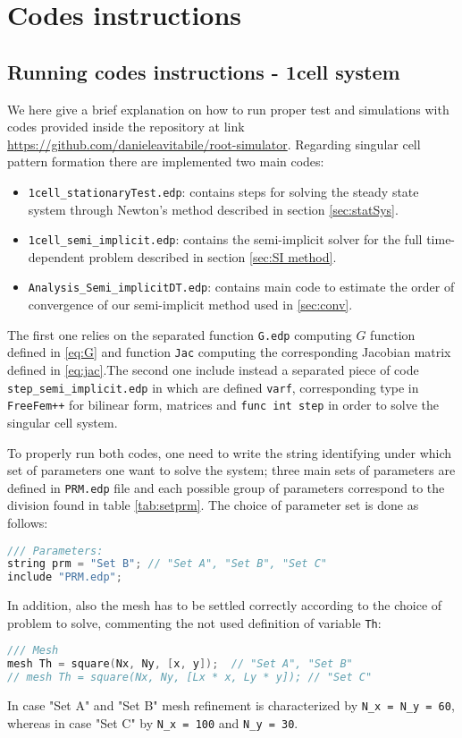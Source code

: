 \chapter{Codes instructions}

\section{Running codes instructions - 1cell system}\label{sec:1code}

We here give a brief explanation on how to run proper test and simulations with codes provided inside the repository at link \url{https://github.com/danieleavitabile/root-simulator}. Regarding singular cell pattern formation there are implemented two main codes:
\begin{itemize}
    \item \verb|1cell_stationaryTest.edp|: contains steps for solving the steady state system through Newton's method described in section \ref{sec:statSys}.
    \item \verb|1cell_semi_implicit.edp|: contains the semi-implicit solver for the full time-dependent problem described in section \ref{sec:SI method}.
    \item \verb|Analysis_Semi_implicitDT.edp|: contains main code to estimate the order of convergence of our semi-implicit method used in \ref{sec:conv}.
\end{itemize}

The first one relies on the separated function \verb|G.edp| computing $G$ function defined in \eqref{eq:G} and function \verb|Jac| computing the corresponding Jacobian matrix defined in \eqref{eq:jac}.The second one include instead a separated piece of code \verb|step_semi_implicit.edp|
in which are defined \verb|varf|,  corresponding type in \verb|FreeFem++| for bilinear form, matrices and \verb|func int step| in order to solve the singular cell system.

To properly run both codes, one need to write the string identifying under which set of parameters one want to solve the system; three main sets of parameters are defined in \verb|PRM.edp| file and each possible group of parameters correspond to the division found in table \ref{tab:setprm}. The choice of parameter set is done as follows:
\begin{lstlisting}[firstnumber = 11, language = C++, caption = Choice of set of parameters]
/// Parameters:
string prm = "Set B"; // "Set A", "Set B", "Set C"
include "PRM.edp";
\end{lstlisting}
In addition, also the mesh has to be settled correctly according to the choice of problem to solve, commenting the not used definition of variable \verb|Th|:
\begin{lstlisting}[firstnumber = 16, language = C++, caption = 1cell\_stationaryTest.edp or 1cell\_semi\_implicit.edp: choice of mesh]
/// Mesh
mesh Th = square(Nx, Ny, [x, y]);  // "Set A", "Set B"
// mesh Th = square(Nx, Ny, [Lx * x, Ly * y]); // "Set C"
\end{lstlisting}
In case "Set A" and "Set B" mesh refinement is characterized by \verb|N_x = N_y = 60|, whereas in case "Set C" by \verb|N_x = 100| and \verb|N_y = 30|.

